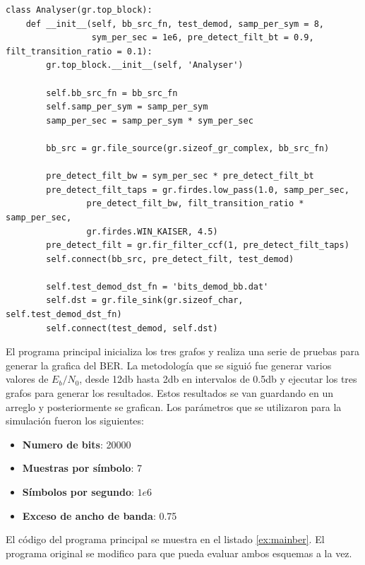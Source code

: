 \begin{lstlisting}[float, label=ex:analizer, caption={C\'odigo que implementa el grafo demodulador
para el analisis del BER.}, breaklines=true]
class Analyser(gr.top_block):
    def __init__(self, bb_src_fn, test_demod, samp_per_sym = 8,
                 sym_per_sec = 1e6, pre_detect_filt_bt = 0.9, filt_transition_ratio = 0.1):
        gr.top_block.__init__(self, 'Analyser')

        self.bb_src_fn = bb_src_fn
        self.samp_per_sym = samp_per_sym
        samp_per_sec = samp_per_sym * sym_per_sec

        bb_src = gr.file_source(gr.sizeof_gr_complex, bb_src_fn)

        pre_detect_filt_bw = sym_per_sec * pre_detect_filt_bt
        pre_detect_filt_taps = gr.firdes.low_pass(1.0, samp_per_sec,
                pre_detect_filt_bw, filt_transition_ratio * samp_per_sec,
                gr.firdes.WIN_KAISER, 4.5)
        pre_detect_filt = gr.fir_filter_ccf(1, pre_detect_filt_taps)
        self.connect(bb_src, pre_detect_filt, test_demod)

        self.test_demod_dst_fn = 'bits_demod_bb.dat'
        self.dst = gr.file_sink(gr.sizeof_char, self.test_demod_dst_fn)
        self.connect(test_demod, self.dst)
\end{lstlisting}

El programa principal inicializa los tres grafos y realiza una serie de pruebas para generar la
grafica del BER. La metodolog\'ia que se sigui\'o fue generar varios valores de $E_b/N_0$, desde
12db hasta 2db en intervalos de 0.5db y ejecutar los tres grafos para generar los resultados. Estos
resultados se van guardando en un arreglo y posteriormente se grafican. Los par\'ametros que se
utilizaron para la simulaci\'on fueron los siguientes:

\begin{itemize}
  \item \textbf{Numero de bits}: 20000
  \item \textbf{Muestras por s\'imbolo}: 7
  \item \textbf{S\'imbolos por segundo}: $1e6$
  \item \textbf{Exceso de ancho de banda}: 0.75
\end{itemize}

El c\'odigo del programa principal se muestra en el listado \ref{ex:mainber}. El programa original
se modifico para que pueda evaluar ambos esquemas a la vez.

